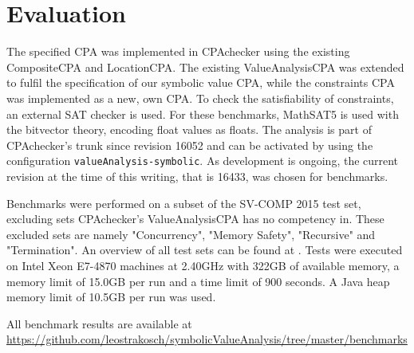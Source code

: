 \section{Evaluation}
The specified CPA was implemented in CPAchecker\cite{Beyer2011} using the existing CompositeCPA and LocationCPA.
The existing ValueAnalysisCPA  was extended to fulfil the specification of our symbolic value CPA,
while the constraints CPA was implemented as a new, own CPA. To check the satisfiability of constraints, an external SAT checker is used. For these benchmarks, MathSAT5 is used with the bitvector theory, encoding float values as floats.
The analysis is part of CPAchecker's trunk since revision 16052 and can be activated by using the configuration \texttt{valueAnalysis-symbolic}. As development is ongoing, the current revision at the time of this writing, that is 16433, was chosen for benchmarks.

Benchmarks were performed on a subset of the SV-COMP 2015 test set, excluding sets CPAchecker's ValueAnalysisCPA has no competency in.
These excluded sets are namely "Concurrency", "Memory Safety", "Recursive" and "Termination". An overview of all test sets can be found at \cite{SV15Tasks}.
Tests were executed on Intel Xeon E7-4870 machines at 2.40GHz with 322GB of available memory, a memory limit of 15.0GB per run and a time limit of 900 seconds.
A Java heap memory limit of 10.5GB per run was used.

All benchmark results are available at \url{https://github.com/leostrakosch/symbolicValueAnalysis/tree/master/benchmarks}

